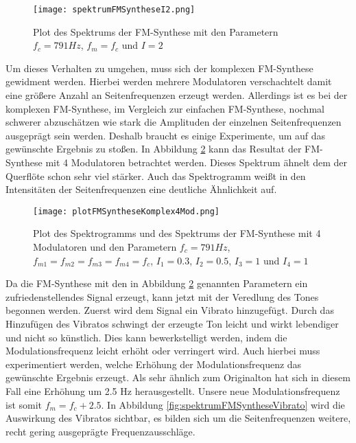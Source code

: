 \begin{figure} [ht]
\centering
  \texttt{[image: spektrumFMSyntheseI2.png]}
\caption{Plot des Spektrums der FM-Synthese mit den Parametern $f_c = 791 Hz$, $f_m = f_c$ und $I = 2$}
\label{fig:spektrumFMSyntheseI2}
\end{figure}

Um dieses Verhalten zu umgehen, muss sich der komplexen FM-Synthese gewidment werden. Hierbei werden mehrere Modulatoren verschachtelt damit eine größere Anzahl an Seitenfrequenzen erzeugt werden. Allerdings ist es bei der komplexen FM-Synthese, im Vergleich zur einfachen FM-Synthese, nochmal schwerer abzuschätzen wie stark die Amplituden der einzelnen Seitenfrequenzen ausgeprägt sein werden. Deshalb braucht es einige Experimente, um auf das gewünschte Ergebnis zu stoßen. In Abbildung \ref{fig:plotFMSyntheseKomplex4Mod} kann das Resultat der FM-Synthese mit 4 Modulatoren betrachtet werden. Dieses Spektrum ähnelt dem der Querflöte schon sehr viel stärker. Auch das Spektrogramm weißt in den Intensitäten der Seitenfrequenzen eine deutliche Ähnlichkeit auf.

\begin{figure} [ht]
\centering
  \texttt{[image: plotFMSyntheseKomplex4Mod.png]}
\caption{Plot des Spektrogramms und des Spektrums der FM-Synthese mit 4 Modulatoren und den Parametern $f_c = 791 Hz$, $f_{m1} = f_{m2} = f_{m3} = f_{m4} = f_c$, $I_1 = 0.3$, $I_2 = 0.5$, $I_3 = 1$ und $I_4 = 1$}
\label{fig:plotFMSyntheseKomplex4Mod}
\end{figure}

Da die FM-Synthese mit den in Abbildung \ref{fig:plotFMSyntheseKomplex4Mod} genannten Parametern ein zufriedenstellendes Signal erzeugt, kann jetzt mit der Veredlung des Tones begonnen werden. Zuerst wird dem Signal ein Vibrato hinzugefügt. Durch das Hinzufügen des Vibratos schwingt der erzeugte Ton leicht und wirkt lebendiger und nicht so künstlich. Dies kann bewerkstelligt werden, indem die Modulationsfrequenz leicht erhöht oder verringert wird. Auch hierbei muss experimentiert werden, welche Erhöhung der Modulationsfrequenz das gewünschte Ergebnis erzeugt. Als sehr ähnlich zum Originalton hat sich in diesem Fall eine Erhöhung um 2.5 Hz herausgestellt. Unsere neue Modulationsfrequenz ist somit $f_m = f_c + 2.5$. In Abbildung \ref{fig:spektrumFMSyntheseVibrato} wird die Auswirkung des Vibratos sichtbar, es bilden sich um die Seitenfrequenzen weitere, recht gering ausgeprägte Frequenzausschläge.

